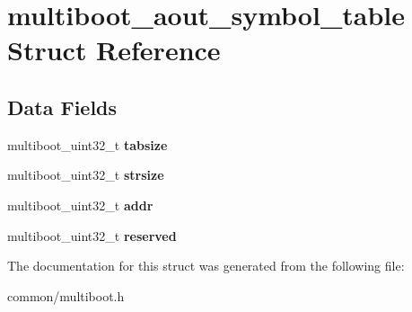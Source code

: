 \hypertarget{structmultiboot__aout__symbol__table}{}\section{multiboot\+\_\+aout\+\_\+symbol\+\_\+table Struct Reference}
\label{structmultiboot__aout__symbol__table}
\subsection*{Data Fields}
\begin{DoxyCompactItemize}
\item 
multiboot\+\_\+uint32\+\_\+t {\bfseries tabsize}\hypertarget{structmultiboot__aout__symbol__table_a3c9cc58c068678c095a7695f74375ca2}{}\label{structmultiboot__aout__symbol__table_a3c9cc58c068678c095a7695f74375ca2}

\item 
multiboot\+\_\+uint32\+\_\+t {\bfseries strsize}\hypertarget{structmultiboot__aout__symbol__table_af9876cbe1b37935ed039c855f04b760e}{}\label{structmultiboot__aout__symbol__table_af9876cbe1b37935ed039c855f04b760e}

\item 
multiboot\+\_\+uint32\+\_\+t {\bfseries addr}\hypertarget{structmultiboot__aout__symbol__table_ab399f68a251079409489149a5d48033f}{}\label{structmultiboot__aout__symbol__table_ab399f68a251079409489149a5d48033f}

\item 
multiboot\+\_\+uint32\+\_\+t {\bfseries reserved}\hypertarget{structmultiboot__aout__symbol__table_a2317e4e566e417b8fb3502074e0807d7}{}\label{structmultiboot__aout__symbol__table_a2317e4e566e417b8fb3502074e0807d7}

\end{DoxyCompactItemize}


The documentation for this struct was generated from the following file\+:\begin{DoxyCompactItemize}
\item 
common/multiboot.\+h\end{DoxyCompactItemize}
